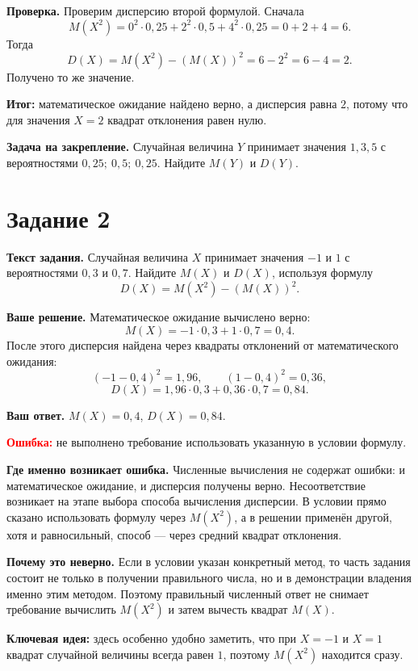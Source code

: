 \documentclass[12pt,a4paper]{article}
\begin{document}
\textbf{Проверка.}
Проверим дисперсию второй формулой. Сначала
\[
M(X^2)=0^2\cdot0{,}25+2^2\cdot0{,}5+4^2\cdot0{,}25
=0+2+4=6.
\]
Тогда
\[
D(X)=M(X^2)-(M(X))^2=6-2^2=6-4=2.
\]
Получено то же значение.

\textcolor{teal!60!black}{\textbf{Итог:}} математическое ожидание найдено верно, а дисперсия равна $2$, потому что для значения $X=2$ квадрат отклонения равен нулю.

\textbf{Задача на закрепление.}
Случайная величина $Y$ принимает значения $1,3,5$ с вероятностями $0{,}25;\ 0{,}5;\ 0{,}25$. Найдите $M(Y)$ и $D(Y)$.

\newpage
{}\label{task:2}
\section*{Задание 2}

\textbf{Текст задания.}
Случайная величина $X$ принимает значения $-1$ и $1$ с вероятностями $0{,}3$ и $0{,}7$. Найдите $M(X)$ и $D(X)$, используя формулу
\[
D(X)=M(X^2)-(M(X))^2.
\]

\textbf{Ваше решение.}
Математическое ожидание вычислено верно:
\[
M(X)=-1\cdot0{,}3+1\cdot0{,}7=0{,}4.
\]
После этого дисперсия найдена через квадраты отклонений от математического ожидания:
\[
(-1-0{,}4)^2=1{,}96,\qquad (1-0{,}4)^2=0{,}36,
\]
\[
D(X)=1{,}96\cdot0{,}3+0{,}36\cdot0{,}7=0{,}84.
\]

\textbf{Ваш ответ.}
$M(X)=0{,}4$, $D(X)=0{,}84$.

\textcolor{red}{\textbf{Ошибка:}} не выполнено требование использовать указанную в условии формулу.

\textbf{Где именно возникает ошибка.}
Численные вычисления не содержат ошибки: и математическое ожидание, и дисперсия получены верно. Несоответствие возникает на этапе выбора способа вычисления дисперсии. В условии прямо сказано использовать формулу через $M(X^2)$, а в решении применён другой, хотя и равносильный, способ --- через средний квадрат отклонения.

\textbf{Почему это неверно.}
Если в условии указан конкретный метод, то часть задания состоит не только в получении правильного числа, но и в демонстрации владения именно этим методом. Поэтому правильный численный ответ не снимает требование вычислить $M(X^2)$ и затем вычесть квадрат $M(X)$.

\textcolor{blue!60!black}{\textbf{Ключевая идея:}} здесь особенно удобно заметить, что при $X=-1$ и $X=1$ квадрат случайной величины всегда равен $1$, поэтому $M(X^2)$ находится сразу.
\end{document}
